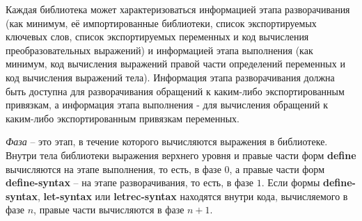 Каждая библиотека может характеризоваться информацией этапа разворачивания (как минимум, её
импортированные библиотеки, список экспортируемых ключевых слов, список экспортируемых
переменных и код вычисления преобразовательных выражений) и информацией этапа выполнения
(как минимум, код вычисления выражений правой части определений переменных и код
вычисления выражений тела). Информация этапа разворачивания должна быть доступна для разворачивания
обращений к каким-либо экспортированным привязкам, а информация этапа выполнения -
для вычисления обращений к каким-либо экспортированным привязкам переменных.\vspace{-1.2mm}

%
\emph{Фаза} -- это этап, в течение которого вычисляются выражения в библиотеке. Внутри тела
библиотеки выражения верхнего уровня и правые части форм {\cf\bfseries define} вычисляются на
этапе выполнения, то есть, в фазе $0$, а правые части форм {\cf\bfseries define-syntax} -- на этапе
разворачивания, то есть, в фазе $1$. Если формы {\cf\bfseries define-syntax}, {\cf\bfseries
  let-syntax} или {\cf\bfseries letrec-syntax} находятся внутри кода, вычисляемого в фазе $n$,
правые части вычисляются в фазе $n+1$.


